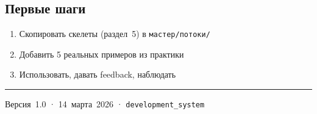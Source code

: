 \documentclass[10pt, oneside]{article}
\begin{document}
\subsection{Первые шаги}

\begin{enumerate}
  \item Скопировать скелеты (раздел~5) в \texttt{мастер/потоки/}
  \item Добавить 5 реальных примеров из практики
  \item Использовать, давать feedback, наблюдать
\end{enumerate}

\vfill
\vspace{4mm}
{\color{AccentBlue}\rule{\linewidth}{0.4pt}}
{\fontsize{6.5}{8}\color{MidGray}
  Версия~1.0 · 14~марта~2026 · \texttt{development\_system}
}
\end{document}
